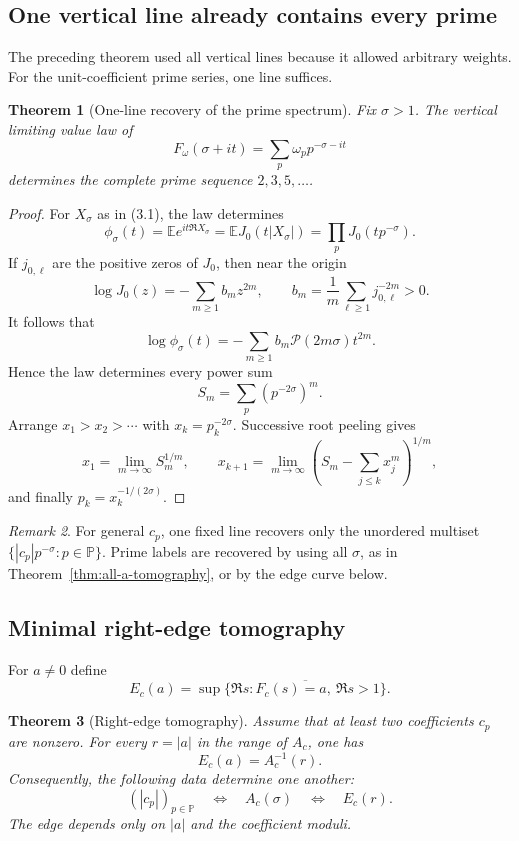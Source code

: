 \documentclass[11pt]{article}
\newtheorem{theorem}{Theorem}[section]
\theoremstyle{definition}
\theoremstyle{remark}
\newtheorem{remark}[theorem]{Remark}
\newcommand{\PP}{\mathbb P}
\newcommand{\cP}{\mathcal P}
\begin{document}
\subsection{One vertical line already contains every prime}

The preceding theorem used all vertical lines because it allowed arbitrary weights.
For the unit-coefficient prime series, one line suffices.

\begin{theorem}[One-line recovery of the prime spectrum]
\label{thm:one-line-recovery}
Fix $\sigma>1$.  The vertical limiting value law of
\[
 F_\omega(\sigma+it)=\sum_p\omega_pp^{-\sigma-it}
\]
determines the complete prime sequence $2,3,5,\ldots$.
\end{theorem}

\begin{proof}
For $X_\sigma$ as in (3.1), the law determines
\[
 \phi_\sigma(t)=\mathbb E e^{it\Re X_\sigma}
 =\mathbb E J_0(t|X_\sigma|)
 =\prod_pJ_0(tp^{-\sigma}).
\tag{5.8}
\]
If $j_{0,\ell}$ are the positive zeros of $J_0$, then near the origin
\[
 \log J_0(z)=-\sum_{m\ge1}b_mz^{2m},
 \qquad
 b_m=\frac1m\sum_{\ell\ge1}j_{0,\ell}^{-2m}>0.
\tag{5.9}
\]
It follows that
\[
 \log\phi_\sigma(t)
 =-\sum_{m\ge1}b_m\cP(2m\sigma)t^{2m}.
\tag{5.10}
\]
Hence the law determines every power sum
\[
 S_m=\sum_p(p^{-2\sigma})^m.
\]
Arrange $x_1>x_2>\cdots$ with $x_k=p_k^{-2\sigma}$.  Successive root peeling gives
\[
 x_1=\lim_{m\to\infty}S_m^{1/m},
\qquad
 x_{k+1}=\lim_{m\to\infty}
 \left(S_m-\sum_{j\le k}x_j^m\right)^{1/m},
\tag{5.11}
\]
and finally $p_k=x_k^{-1/(2\sigma)}$.
\end{proof}

\begin{remark}
For general $c_p$, one fixed line recovers only the unordered multiset
$\{|c_p|p^{-\sigma}:p\in\PP\}$.  Prime labels are recovered by using all $\sigma$,
as in Theorem~\ref{thm:all-a-tomography}, or by the edge curve below.
\end{remark}

\subsection{Minimal right-edge tomography}

For $a\ne0$ define
\[
 E_c(a)=
 \sup\overline{\{\Re s:F_c(s)=a,\ \Re s>1\}}.
\tag{5.12}
\]

\begin{theorem}[Right-edge tomography]
\label{thm:right-edge-tomography}
Assume that at least two coefficients $c_p$ are nonzero.  For every
$r=|a|$ in the range of $A_c$, one has
\[
 \boxed{E_c(a)=A_c^{-1}(r).}
\tag{5.13}
\]
Consequently, the following data determine one another:
\[
 \boxed{
 (|c_p|)_{p\in\PP}
 \quad\Longleftrightarrow\quad
 A_c(\sigma)
 \quad\Longleftrightarrow\quad
 E_c(r).
 }
\tag{5.14}
\]
The edge depends only on $|a|$ and the coefficient moduli.
\end{theorem}
\end{document}
